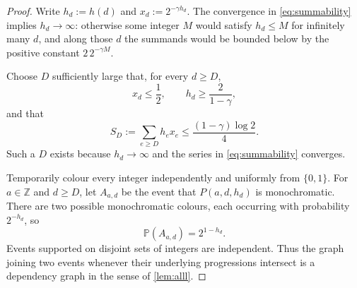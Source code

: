 \documentclass[11pt]{article}
\theoremstyle{definition}
\theoremstyle{remark}
\newcommand{\Z}{\mathbb Z}
\begin{document}
\begin{proof}
Write $h_d:=h(d)$ and $x_d:=2^{-\gamma h_d}$. The convergence in \eqref{eq:summability} implies $h_d\to\infty$: otherwise some integer $M$ would satisfy $h_d\le M$ for infinitely many $d$, and along those $d$ the summands would be bounded below by the positive constant $2\,2^{-\gamma M}$.

Choose $D$ sufficiently large that, for every $d\ge D$,
\begin{equation}\label{eq:D-size-conditions}
x_d\le\frac12,
\qquad
h_d\ge\frac{2}{1-\gamma},
\end{equation}
and that
\begin{equation}\label{eq:tail-small}
S_D:=\sum_{e\ge D}h_ex_e
\le\frac{(1-\gamma)\log 2}{4}.
\end{equation}
Such a $D$ exists because $h_d\to\infty$ and the series in \eqref{eq:summability} converges.

Temporarily colour every integer independently and uniformly from $\{0,1\}$. For $a\in\Z$ and $d\ge D$, let $A_{a,d}$ be the event that $P(a,d,h_d)$ is monochromatic. There are two possible monochromatic colours, each occurring with probability $2^{-h_d}$, so
\begin{equation}\label{eq:bad-probability}
\mathbb P(A_{a,d})=2^{1-h_d}.
\end{equation}
Events supported on disjoint sets of integers are independent. Thus the graph joining two events whenever their underlying progressions intersect is a dependency graph in the sense of \cref{lem:alll}.


\end{proof}
\end{document}
